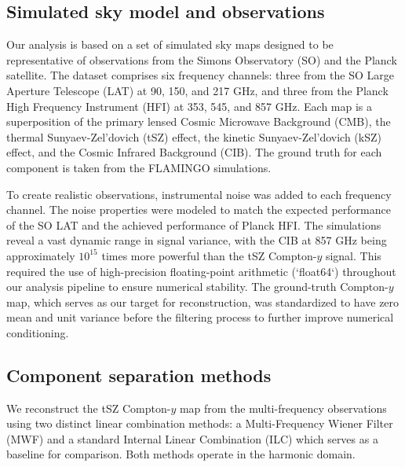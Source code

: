 \documentclass[]{article}
\begin{document}
\subsection{Simulated sky model and observations}
Our analysis is based on a set of simulated sky maps designed to be representative of observations from the Simons Observatory (SO) and the Planck satellite. The dataset comprises six frequency channels: three from the SO Large Aperture Telescope (LAT) at 90, 150, and 217 GHz, and three from the Planck High Frequency Instrument (HFI) at 353, 545, and 857 GHz. Each map is a superposition of the primary lensed Cosmic Microwave Background (CMB), the thermal Sunyaev-Zel'dovich (tSZ) effect, the kinetic Sunyaev-Zel'dovich (kSZ) effect, and the Cosmic Infrared Background (CIB). The ground truth for each component is taken from the FLAMINGO simulations.

To create realistic observations, instrumental noise was added to each frequency channel. The noise properties were modeled to match the expected performance of the SO LAT and the achieved performance of Planck HFI. The simulations reveal a vast dynamic range in signal variance, with the CIB at 857 GHz being approximately $10^{15}$ times more powerful than the tSZ Compton-$y$ signal. This required the use of high-precision floating-point arithmetic (`float64`) throughout our analysis pipeline to ensure numerical stability. The ground-truth Compton-$y$ map, which serves as our target for reconstruction, was standardized to have zero mean and unit variance before the filtering process to further improve numerical conditioning.

\subsection{Component separation methods}
We reconstruct the tSZ Compton-$y$ map from the multi-frequency observations using two distinct linear combination methods: a Multi-Frequency Wiener Filter (MWF) and a standard Internal Linear Combination (ILC) which serves as a baseline for comparison. Both methods operate in the harmonic domain.
\end{document}
